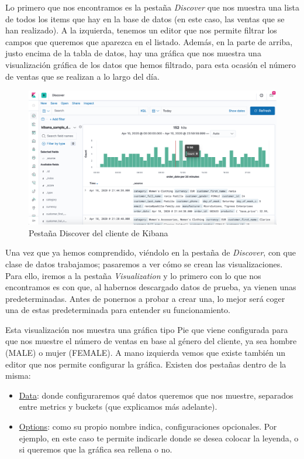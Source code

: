 \documentclass[a4paper, 12pt]{book}
\begin{document}
Lo primero que nos encontramos es la pestaña \textit{Discover} que nos muestra una lista de todos los items que hay en la base de datos (en este caso, las ventas que se han realizado). A la izquierda, tenemos un editor que nos permite filtrar los campos que queremos que aparezca en el listado. Además, en la parte de arriba, justo encima de la tabla de datos, hay una gráfica que nos muestra una visualización gráfica de los datos que hemos filtrado, para esta ocasión el número de ventas que se realizan a lo largo del día.

\begin{figure}[H]
  \centering
  \includegraphics[width=12cm, keepaspectratio]{img/development/Discover-kibana.png}
  \caption{Pestaña Discover del cliente de Kibana}
  \label{fig:Kibanadiscover}
\end{figure}

Una vez que ya hemos comprendido, viéndolo en la pestaña de \textit{Discover}, con que clase de datos trabajamos; pasaremos a ver cómo se crean las visualizaciones. Para ello, iremos a la pestaña \textit{Visualization} y lo primero con lo que nos encontramos es con que, al habernos descargado datos de prueba, ya vienen unas predeterminadas. Antes de ponernos a probar a crear una, lo mejor será coger una de estas predeterminada para entender su funcionamiento.

Esta visualización nos muestra una gráfica tipo Pie que viene configurada para que nos muestre el número de ventas en base al género del cliente, ya sea hombre (MALE) o mujer (FEMALE). A mano izquierda vemos que existe también un editor que nos permite configurar la gráfica. Existen dos pestañas dentro de la misma:

\begin{itemize}
    \item \underline{Data}: donde configuraremos qué datos queremos que nos muestre, separados entre metrics y buckets (que explicamos más adelante).
    \item \underline{Options}: como su propio nombre indica, configuraciones opcionales. Por ejemplo, en este caso te permite indicarle donde se desea colocar la leyenda, o si queremos que la gráfica sea rellena o no.
\end{itemize}
\end{document}
